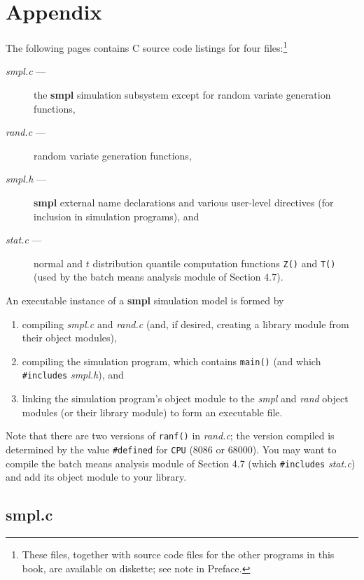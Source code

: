 \chapter{Appendix}
\label{chap:appendix-source}

The following pages contains C source code listings for four files:\footnote{These
files, together with source code files for the other programs in this book, are
available on diskette; see note in Preface.}
\begin{description}
\item[\textit{smpl.c} ---] the \textbf{smpl} simulation subsystem except for random
variate generation functions,
\item[\textit{rand.c} ---] random variate generation functions,
\item[\textit{smpl.h} ---] \textbf{smpl} external name declarations and various
user-level directives (for inclusion in simulation programs), and
\item[\textit{stat.c} ---] normal and $t$ distribution quantile computation
functions \texttt{Z()} and \texttt{T()} (used by the batch means analysis module
of Section 4.7).
\end{description}

An executable instance of a \textbf{smpl} simulation model is formed by
\begin{enumerate}
\item compiling \textit{smpl.c} and \textit{rand.c} (and, if desired, creating a
library module from their object modules),
\item compiling the simulation program, which contains \texttt{main()}
(and which \texttt{\#includes} \textit{smpl.h}), and
\item linking the simulation program's object module to the \textit{smpl}
and \textit{rand} object modules (or their library module) to form an
executable file.
\end{enumerate}
Note that there are two versions of \texttt{ranf()} in \textit{rand.c}; the
version compiled is determined by the value \texttt{\#defined} for \texttt{CPU}
(8086 or 68000). You may want to compile the batch means analysis module of
Section 4.7 (which \texttt{\#includes} \textit{stat.c}) and add its object module
to your library.

\section{smpl.c}\label{appendix-smpl}


